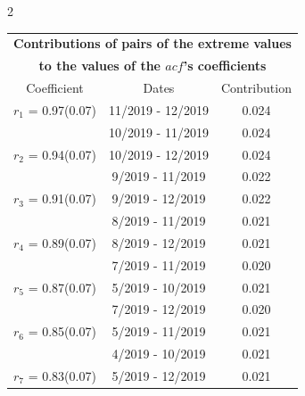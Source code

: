 
\thispagestyle{empty}
\begin{multicols}{2}{ 
\begin{tabular}{ccc}
\multicolumn{3}{c}{\textbf{Contributions of pairs of the extreme values} }  \vspace{-.10in}  \\ 
\multicolumn{3}{c}{ \textbf{to the values of the $acf$'s coefficients}} \\ 
\hline 
\hline                  Coefficient  &  Dates &  Contribution \\ 
\hline 
  $r_{ 1}$ = 0.97(0.07) &      11/2019 - 12/2019 &        0.024   \vspace{-.10in} \\  
&       10/2019 - 11/2019 &        0.024  \vspace{-.02in} \\ \hline 
  $r_{ 2}$ = 0.94(0.07) &      10/2019 - 12/2019 &        0.024   \vspace{-.10in} \\  
&        9/2019 - 11/2019 &        0.022  \vspace{-.02in} \\ \hline 
  $r_{ 3}$ = 0.91(0.07) &       9/2019 - 12/2019 &        0.022   \vspace{-.10in} \\  
&        8/2019 - 11/2019 &        0.021  \vspace{-.02in} \\ \hline 
  $r_{ 4}$ = 0.89(0.07) &       8/2019 - 12/2019 &        0.021   \vspace{-.10in} \\  
&        7/2019 - 11/2019 &        0.020  \vspace{-.02in} \\ \hline 
  $r_{ 5}$ = 0.87(0.07) &       5/2019 - 10/2019 &        0.021   \vspace{-.10in} \\  
&        7/2019 - 12/2019 &        0.020  \vspace{-.02in} \\ \hline 
  $r_{ 6}$ = 0.85(0.07) &       5/2019 - 11/2019 &        0.021   \vspace{-.10in} \\  
&        4/2019 - 10/2019 &        0.021  \vspace{-.02in} \\ \hline 
  $r_{ 7}$ = 0.83(0.07) &       5/2019 - 12/2019 &        0.021   \vspace{-.10in} \\  

\end{tabular}}
\end{multicols}
